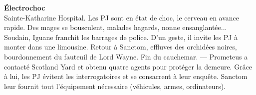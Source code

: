 \documentclass[11pt,twoside,a4paper]{book}
\begin{document}
\clearpage

\textbf{\large {\'E}lectrochoc}~\\

Sainte-Katharine Hospital. Les PJ sont en {\'e}tat de choc, le cerveau en avance rapide. Des mages se bousculent, malades hagards, nonne ensanglant{\'e}e... Soudain, Iguane franchit les barrages de police. D'un geste, il invite les PJ {\`a} monter dans une limousine. Retour {\`a} Sanctom, effluves des orchid{\'e}es noires, bourdonnement du fauteuil de Lord Wayne. Fin du cauchemar. --- Prometeus a contact{\'e} Scotland Yard et obtenu quatre agents pour prot{\'e}ger la demeure. Gr{\^a}ce {\`a} lui, les PJ {\'e}vitent les interrogatoires et se consacrent {\`a} leur enqu{\^e}te. Sanctom leur fournit tout l'{\'e}quipement n{\'e}cessaire (v{\'e}hicules, armes, ordinateurs).~\\

\end{document}
